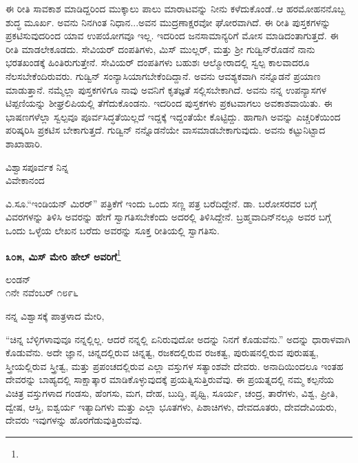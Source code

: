 ಈ ರೀತಿ ಸಾವಕಾಶ ಮಾಡಿದ್ದರಿಂದ ಮುಕ್ಕಾಲು ಪಾಲು ಮಾರಾಟವನ್ನು ನೀನು ಕಳೆದುಕೊಂಡೆ..ಆ ಹರಮೋಹನನೊಬ್ಬ ಶುದ್ಧ ಮೂರ್ಖ. ಅವನು ನಿನಗಿಂತ ನಿಧಾನ...ಅವನ ಮುದ್ರಣಾಕ್ಷರವೋ ಘೋರವಾಗಿದೆ. ಈ ರೀತಿ ಪುಸ್ತಕಗಳನ್ನು ಪ್ರಕಟಿಸುವುದರಿಂದ ಯಾವ ಉಪಯೋಗವೂ ಇಲ್ಲ. ಇದರಿಂದ ಜನಸಾಮಾನ್ಯರಿಗೆ ಮೋಸ ಮಾಡಿದಂತಾಗುತ್ತದೆ. ಈ ರೀತಿ ಮಾಡಲೇಕೂಡದು. ಸೇವಿಯರ್ ದಂಪತಿಗಳು, ಮಿಸ್ ಮುಲ್ಲರ್, ಮತ್ತು ಶ‍್ರೀ ಗುಡ್ವಿನ್‌ರೊಡನೆ ನಾನು ಭರತಖಂಡಕ್ಕೆ ಹಿಂತಿರುಗುತ್ತೇನೆ. ಸೇವಿಯರ್ ದಂಪತಿಗಳು ಬಹುಶಃ ಆಲ್ಮೋರಾದಲ್ಲಿ ಸ್ವಲ್ಪ ಕಾಲವಾದರೂ ನೆಲಸಬೇಕೆಂದಿರುವರು. ಗುಡ್ವಿನ್ ಸಂನ್ಯಾಸಿಯಾಗಬೇಕೆಂದಿದ್ದಾನೆ. ಅವನು ಆವಶ್ಯಕವಾಗಿ ನನ್ನೊಡನೆ ಪ್ರಯಾಣ ಮಾಡುತ್ತಾನೆ. ನಮ್ಮೆಲ್ಲಾ ಪುಸ್ತಕಗಳಿಗೂ ನಾವು ಅವನಿಗೆ ಕೃತಜ್ಞತೆ ಸಲ್ಲಿಸಬೇಕಾಗಿದೆ. ಅವನು ನನ್ನ ಉಪನ್ಯಾಸಗಳ ಟಿಪ್ಪಣಿಯನ್ನು ಶೀಘ್ರಲಿಪಿಯಲ್ಲಿ ತೆಗೆದುಕೊಂಡನು. ಇದರಿಂದ ಪುಸ್ತಕಗಳು ಪ್ರಕಟವಾಗಲು ಅವಕಾಶವಾಯಿತು. ಈ ಭಾಷಣಗಳೆಲ್ಲಾ ಸ್ವಲ್ಪವೂ ಪೂರ್ವಸಿದ್ಧತೆಯಿಲ್ಲದೆ ಇದ್ದಕ್ಕೆ ಇದ್ದಂತೆಯೇ ಕೊಟ್ಟಿದ್ದು. ಹಾಗಾಗಿ ಅವನ್ನು ಎಚ್ಚರಿಕೆಯಿಂದ ಪರಿಷ್ಕರಿಸಿ ಪ್ರಕಟಿಸ ಬೇಕಾಗುತ್ತದೆ. ಗುಡ್ವಿನ್ ನನ್ನೊಡನೆಯೇ ವಾಸಮಾಡಬೇಕಾಗುವುದು. ಅವನು ಕಟ್ಟುನಿಟ್ಟಾದ ಶಾಖಾಹಾರಿ.
\vspace{-0.5cm}

\begin{flushright}
ವಿಶ್ವಾಸಪೂರ್ವಕ ನಿನ್ನ\\ವಿವೇಕಾನಂದ
\end{flushright}

ವಿ.ಸೂ.\enginline{-}“ಇಂಡಿಯನ್ ಮಿರರ್” ಪತ್ರಿಕೆಗೆ ಇಂದು ಒಂದು ಸಣ್ಣ ಪತ್ರ ಬರೆದಿದ್ದೇನೆ. ಡಾ. ಬರೋಸರವರ ಬಗ್ಗೆ ವಿವರಗಳನ್ನು ತಿಳಿಸಿ ಅವರನ್ನು ಹೇಗೆ ಸ್ವಾಗತಿಸಬೇಕೆಂದು ಅದರಲ್ಲಿ ತಿಳಿಸಿದ್ದೇನೆ. ಬ್ರಹ್ಮವಾದಿನ್‌ನಲ್ಲೂ ಅವರ ಬಗ್ಗೆ ಒಂದು ಒಳ್ಳೆಯ ಲೇಖನ ಬರೆದು ಅವರನ್ನು ಸೂಕ್ತ ರೀತಿಯಲ್ಲಿ ಸ್ವಾಗತಿಸು.

\begin{center}
\textbf{೩೦೫, ಮಿಸ್ ಮೇರಿ ಹೇಲ್‌ ಅವರಿಗೆ}\footnote{}
\end{center}
\vspace{-0.7cm}

\begin{flushright}
ಲಂಡನ್\\೧ನೇ ನವೆಂಬರ್ ೧೮೯೬
\end{flushright}
\vspace{-0.3cm}

\noindent
ನನ್ನ ವಿಶ್ವಾಸಕ್ಕೆ ಪಾತ್ರಳಾದ ಮೇರಿ,

“ಚಿನ್ನ ಬೆಳ್ಳಿಗಳಾವುವೂ ನನ್ನಲ್ಲಿಲ್ಲ. ಆದರೆ ನನ್ನಲ್ಲಿ ಏನಿರುವುದೋ ಅದನ್ನು ನಿನಗೆ ಕೊಡುವೆನು.” ಅದನ್ನು ಧಾರಾಳವಾಗಿ ಕೊಡುವೆನು. ಅದೇ ಜ್ಞಾನ, ಚಿನ್ನದಲ್ಲಿರುವ ಚಿನ್ನತ್ವ, ರಜಕದಲ್ಲಿರುವ ರಜಕತ್ವ, ಪುರುಷನಲ್ಲಿರುವ ಪುರುಷತ್ವ, ಸ್ತ್ರೀಯಲ್ಲಿರುವ ಸ್ತ್ರೀತ್ವ, ಮತ್ತು ಪ್ರಪಂಚದಲ್ಲಿರುವ ಎಲ್ಲಾ ವಸ್ತುಗಳ ಸತ್ಯಾಂಶವೇ ದೇವರು. ಅನಾದಿಯಿಂದಲೂ ಇಂತಹ ದೇವರನ್ನು ಬಾಹ್ಯದಲ್ಲಿ ಸಾಕ್ಷಾತ್ಕಾರ ಮಾಡಿಕೊಳ್ಳುವುದಕ್ಕೆ ಪ್ರಯತ್ನಿಸುತ್ತಿರುವೆವು. ಈ ಪ್ರಯತ್ನದಲ್ಲಿ ನಮ್ಮ ಕಲ್ಪನೆಯ ವಿಚಿತ್ರ ವಸ್ತುಗಳಾದ ಗಂಡಸು, ಹೆಂಗಸು, ಮಗ, ದೇಹ, ಬುದ್ಧಿ, ಪೃಥ್ವಿ, ಸೂರ್ಯ, ಚಂದ್ರ, ತಾರೆಗಳು, ವಿಶ್ವ, ಪ್ರೀತಿ, ದ್ವೇಷ, ಆಸ್ತಿ, ಐಶ್ವರ್ಯ ಇತ್ಯಾದಿಗಳು ಮತ್ತು ಎಲ್ಲಾ ಭೂತಗಳು, ಪಿಶಾಚಿಗಳು, ದೇವದೂತರು, ದೇವದೇವಿಯರು, ದೇವರು ಇವುಗಳನ್ನು ಹೊರಗೆಡುವುತ್ತಿರುವೆವು.

